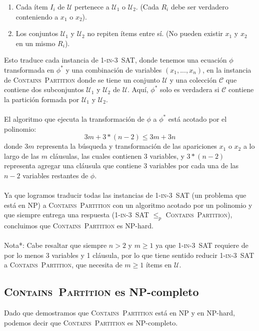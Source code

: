 \documentclass[spanish]{article}
\begin{document}
    \begin{enumerate}
        \item Cada ítem $I_i$ de \(\mathcal{U}\) pertenece a \(\mathcal{U}_1\) o \(\mathcal{U}_2\). (Cada $R_i$ debe ser verdadero conteniendo a $x_1$ o $x_2$).
        \item Los conjuntos \(\mathcal{U}_1\) y \(\mathcal{U}_2\) no repiten ítems entre sí. (No pueden existir $x_1$ y $x_2$ en un mismo $R_i$).
    \end{enumerate}

    Esto traduce cada instancia de \textsc{1-in-3~SAT}, donde tenemos una ecuación $\phi$ transformada en $\phi^*$ y una combinación de variables $(x_1, ..., x_n)$, en la instancia de \textsc{Contains~Partition}
    donde se tiene un conjunto \(\mathcal{U}\) y una colección \(\mathcal{C}\) que contiene dos subconjuntos \(\mathcal{U}_1\) y \(\mathcal{U}_2\) de \(\mathcal{U}\). Aquí, $\phi^*$ solo es verdadera
    si \(\mathcal{C}\) contiene la partición formada por \(\mathcal{U}_1\) y \(\mathcal{U}_2\).
    \\\\
    El algoritmo que ejecuta la transformación de $\phi$ a $\phi^*$ está acotado por el polinomio:
    $$ 3m + 3 * (n-2) \leq 3m + 3n$$
    donde $3m$ representa la búsqueda y transformación de las apariciones $x_1$ o $x_2$ a lo largo de las $m$ cláusulas, las cuales contienen
    3 variables, y $3 * (n-2)$ representa agregar una cláusula que contiene 3 variables por cada una de las $n - 2$ variables restantes de $\phi$.
    \\\\
    Ya que logramos traducir todas las instancias de \textsc{1-in-3~SAT} (un problema que está en NP) a \textsc{Contains~Partition} con un
    algoritmo acotado por un polinomio y que siempre entrega una respuesta (\textsc{1-in-3~SAT} $\leq_p$ \textsc{Contains~Partition}),
    concluimos que \textsc{Contains~Partition} es NP-hard.
    \\\\
    Nota*: Cabe resaltar que siempre $n > 2$ y $m \geq 1$ ya que \textsc{1-in-3~SAT} requiere de por lo menos 3 variables y 1 cláusula, 
    por lo que tiene sentido reducir \textsc{1-in-3~SAT} a \textsc{Contains~Partition}, que necesita de $m \geq 1$ ítems en \(\mathcal{U}\).

\subsection{\textsc{Contains~Partition} es NP-completo}
    Dado que demostramos que \textsc{Contains~Partition} está en NP y en NP-hard, podemos decir que
    \textsc{Contains~Partition} es NP-completo.
\end{document}
